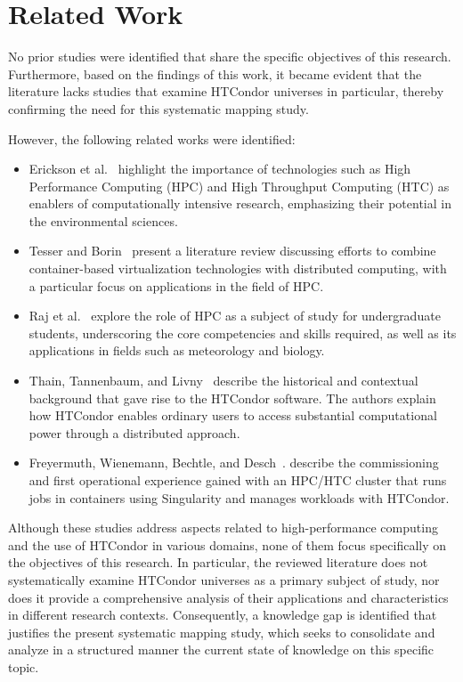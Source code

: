 \section{Related Work}
\label{sec:trabajos-relacionados}
No prior studies were identified that share the specific objectives of this research. Furthermore, based on the findings of this work, it became evident that the literature lacks studies that examine HTCondor universes in particular, thereby confirming the need for this systematic mapping study.

However, the following related works were identified:

\begin{itemize}
	\item Erickson et al.~\cite{EricksonA-01} highlight the importance of technologies such as High Performance Computing (HPC) and High Throughput Computing (HTC) as enablers of computationally intensive research, emphasizing their potential in the environmental sciences.
	\item Tesser and Borin~\cite{KellerTesser2023} present a literature review discussing efforts to combine container-based virtualization technologies with distributed computing, with a particular focus on applications in the field of HPC.
	\item Raj et al.~\cite{RajRomanowski2020} explore the role of HPC as a subject of study for undergraduate students, underscoring the core competencies and skills required, as well as its applications in fields such as meteorology and biology.
	\item Thain, Tannenbaum, and Livny~\cite{Livny-Tannenbaum2005} describe the historical and contextual background that gave rise to the HTCondor software. The authors explain how HTCondor enables ordinary users to access substantial computational power through a distributed approach.
	\item Freyermuth, Wienemann, Bechtle, and Desch~\cite{Freyermuth2021a}. describe the commissioning and first operational experience gained with an HPC/HTC cluster that runs jobs in containers using Singularity and manages workloads with HTCondor.
\end{itemize}

Although these studies address aspects related to high-performance computing and the use of HTCondor in various domains, none of them focus specifically on the objectives of this research. In particular, the reviewed literature does not systematically examine HTCondor universes as a primary subject of study, nor does it provide a comprehensive analysis of their applications and characteristics in different research contexts. Consequently, a knowledge gap is identified that justifies the present systematic mapping study, which seeks to consolidate and analyze in a structured manner the current state of knowledge on this specific topic.